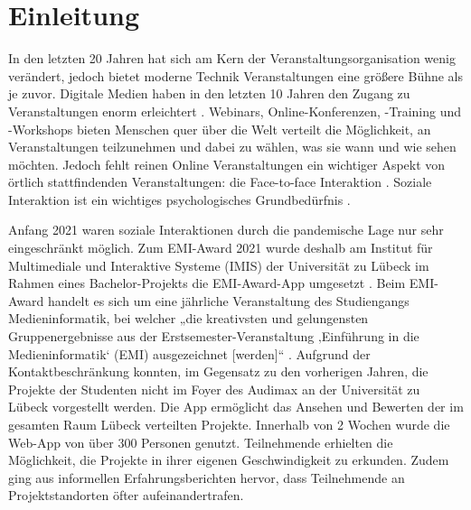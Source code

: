 \chapter{Einleitung} \label{chapter:introduction}

In den letzten 20 Jahren hat sich am Kern der Veranstaltungsorganisation wenig
verändert, jedoch bietet moderne Technik Veranstaltungen eine größere Bühne als
je zuvor. Digitale Medien haben in den letzten 10 Jahren den Zugang zu
Veranstaltungen enorm erleichtert \cite{Bladen2012}. Webinars,
Online-Konferenzen, -Training und -Workshops bieten Menschen quer über die Welt
verteilt die Möglichkeit, an Veranstaltungen teilzunehmen und dabei zu wählen,
was sie wann und wie sehen möchten. Jedoch fehlt reinen Online Veranstaltungen
ein wichtiger Aspekt von örtlich stattfindenden Veranstaltungen: die
Face-to-face Interaktion \cite{Bladen2012}. Soziale Interaktion ist ein wichtiges
psychologisches Grundbedürfnis \cite{Maslow1943}.

Anfang 2021 waren soziale Interaktionen durch die pandemische Lage nur sehr
eingeschränkt möglich. Zum EMI-Award 2021 wurde deshalb am Institut für
Multimediale und Interaktive Systeme (IMIS) der Universität zu Lübeck im Rahmen
eines Bachelor-Projekts die EMI-Award-App umgesetzt \cite{Canzler2021}. Beim
EMI-Award handelt es sich um eine jährliche Veranstaltung des Studiengangs
Medieninformatik, bei welcher „die kreativsten und gelungensten
Gruppenergebnisse aus der Erstsemester-Veranstaltung ‚Einführung in die
Medieninformatik‘ (EMI) ausgezeichnet [werden]“ \cite{UniversitatzuLubeck2021}.
Aufgrund der Kontaktbeschränkung konnten, im Gegensatz zu den vorherigen Jahren,
die Projekte der Studenten nicht im Foyer des Audimax an der Universität zu
Lübeck vorgestellt werden. Die App ermöglicht das Ansehen und Bewerten der im
gesamten Raum Lübeck verteilten Projekte. Innerhalb von 2 Wochen wurde die
Web-App von über 300 Personen genutzt. Teilnehmende erhielten die Möglichkeit,
die Projekte in ihrer eigenen Geschwindigkeit zu erkunden. Zudem ging aus
informellen Erfahrungsberichten hervor, dass Teilnehmende an Projektstandorten
öfter aufeinandertrafen.


